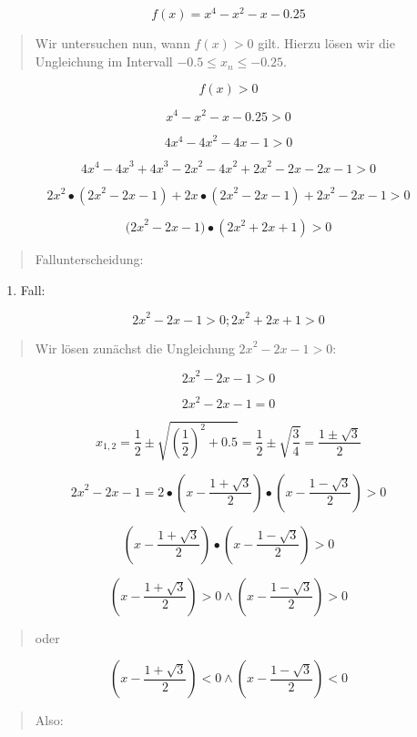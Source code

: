 \documentclass[a4paper, 12pt]{book}
\begin{document}
\begin{longtable}[]
\begin{minipage}[b]{\linewidth}
\[f(x) = x^{4} - x^{2} - x - 0.25\]

\begin{quote}
Wir untersuchen nun, wann \(f(x) > 0\) gilt. Hierzu lösen wir die
Ungleichung im Intervall \(- 0.5{\leq x}_{n} \leq  - 0.25\).
\end{quote}

\[f(x) > 0\]

\[x^{4} - x^{2} - x - 0.25 > 0\]

\[4x^{4} - {4x}^{2} - 4x - 1 > 0\]

\[4x^{4} - {4x}^{3} + {4x}^{3} - {2x}^{2} - {4x}^{2} + {2x}^{2} - 2x - 2x - 1 > 0\]

\[2x^{2} \bullet ({2x}^{2} - 2x - 1) + 2x \bullet ({2x}^{2} - 2x - 1) + {2x}^{2} - 2x - 1 > 0\]

\[{(2x}^{2} - 2x - 1) \bullet ({2x}^{2} + 2x + 1) > 0\]

\begin{quote}
Fallunterscheidung:
\end{quote}

\begin{enumerate}
\def\labelenumi{\arabic{enumi}.}
\item
  Fall:
\end{enumerate}

\[{2x}^{2} - 2x - 1 > 0;{2x}^{2} + 2x + 1 > 0\]

\begin{quote}
Wir lösen zunächst die Ungleichung \({2x}^{2} - 2x - 1 > 0\):
\end{quote}

\[{2x}^{2} - 2x - 1 > 0\]

\[{2x}^{2} - 2x - 1 = 0\]

\[x_{1,2} = \frac{1}{2} \pm \sqrt{\left( \frac{1}{2} \right)^{2} + 0.5} = \frac{1}{2} \pm \sqrt{\frac{3}{4}} = \frac{1 \pm \sqrt{3}}{2}\]

\[{2x}^{2} - 2x - 1 = 2 \bullet (x - \frac{1 + \sqrt{3}}{2}) \bullet (x - \frac{1 - \sqrt{3}}{2}) > 0\]

\[(x - \frac{1 + \sqrt{3}}{2}) \bullet (x - \frac{1 - \sqrt{3}}{2}) > 0\]

\[(x - \frac{1 + \sqrt{3}}{2}) > 0 \land (x - \frac{1 - \sqrt{3}}{2}) > 0\]

\begin{quote}
oder
\end{quote}

\[(x - \frac{1 + \sqrt{3}}{2}) < 0 \land (x - \frac{1 - \sqrt{3}}{2}) < 0\]

\begin{quote}
Also:
\end{quote}


\end{minipage}
\end{longtable}
\end{document}
